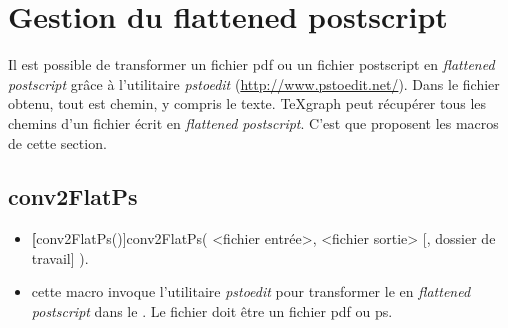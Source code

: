 \section{Gestion du flattened postscript}

Il est possible de transformer un fichier pdf ou un fichier postscript en \textit{flattened postscript} grâce à l'utilitaire \textit{pstoedit} (\url{http://www.pstoedit.net/}). Dans le fichier obtenu, tout est chemin, y compris le texte. TeXgraph peut récupérer tous les chemins d'un fichier écrit en \textit{flattened postscript}. C'est que proposent les macros de cette section.

\subsection{conv2FlatPs}\label{macconv2FlatPs}

\begin{itemize}
 \item \util \textbf[conv2FlatPs()]{conv2FlatPs( <fichier entrée>, <fichier sortie> [, dossier de travail] )}.
 \item \desc cette macro invoque l'utilitaire \textit{pstoedit} pour transformer le  en \textit{flattened postscript} dans le . Le fichier  doit être un fichier pdf ou ps. 
\end{itemize}

